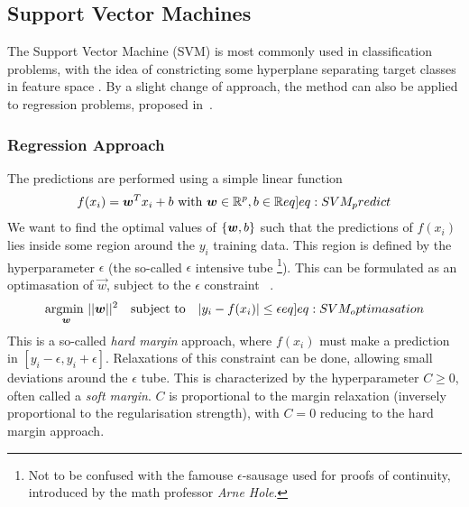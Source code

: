             \subsection{Support Vector Machines}
            The Support Vector Machine (SVM) is most commonly used in classification problems, with the idea of constricting some hyperplane separating target classes in feature space . By a slight change of approach, the method can also be applied to regression problems, proposed in~\citep{SVR}. 
            
                \subsubsection{Regression Approach}
                    The predictions are performed using a simple linear function
                    \begin{align}
                        f(x_i) = \vec{w}^T x_i + b \text{ with } \vec{w} \in \mathbb{R}^p, b \in \mathbb{R} \label[eq]{eq:SVM_predict} 
                    \end{align}
                    We want to find the optimal values of $\{\boldsymbol{w}, b\}$ such that the predictions of $f(x_i)$ lies inside some region around the $y_i$ training data. This region is defined by the hyperparameter $\epsilon$ (the so-called $\epsilon$ intensive tube \footnote{Not to be confused with the famouse $\epsilon$-sausage used for proofs of continuity, introduced by the math professor \textit{Arne Hole}.}). This can be formulated as an optimasation of $\vec{w}$, subject to the $\epsilon$ constraint ~\citep{SVRgood}.  
                    \begin{align}
                        \underset{\vec{w}}{\text{argmin  }}   ||\vec{w}||^2 
                        \hspace{10px}\text{subject to}\hspace{10px} |y_i - f(x_i)| \leq \epsilon \label[eq]{eq:SVM_optimasation}
                    \end{align}
                    This is a so-called \textit{hard margin} approach, where $f(x_i)$ must make a prediction in $[y_i - \epsilon, y_i + \epsilon]$. Relaxations of this constraint can be done, allowing small deviations around the $\epsilon$ tube. This is characterized by the hyperparameter $C \geq 0$, often called a \textit{soft margin}. $C$ is proportional to the margin relaxation (inversely proportional to the regularisation strength), with $C = 0$ reducing to the hard margin approach.  
                
